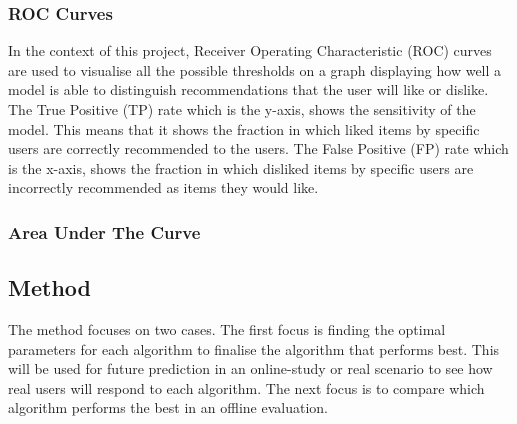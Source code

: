 

\subsubsection{ROC Curves} \label{roc}
In the context of this project, Receiver Operating Characteristic (ROC) curves  are used to visualise all the possible thresholds on a graph displaying how well a model is able to distinguish recommendations that the user will like or dislike. The True Positive (TP) rate which is the y-axis, shows the sensitivity of the model. This means that it shows the fraction in which liked items by specific users are correctly recommended to the users. The False Positive (FP) rate which is the x-axis, shows the fraction in which disliked items by specific users are incorrectly recommended as items they would like. 

\subsubsection{Area Under The Curve} \label{auc}


\subsection{Method} \label{method}


The method focuses on two cases. The first focus is finding the optimal parameters for each algorithm to finalise the algorithm that performs best. This will be used for future prediction in an online-study or real scenario to see how real users will respond to each algorithm. The next focus is to compare which algorithm performs the best in an offline evaluation.

